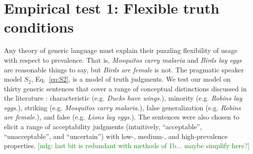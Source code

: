 \documentclass[12pt,letterpaper]{article}
\newcommand{\denote}[1]{\mbox{ $[\![ #1 ]\!]$}}
\newcommand{\ndg}[1]{\textcolor{Green}{[ndg: #1]}}
\begin{document}
%
%
%
%
%




%

\section*{Empirical test 1: Flexible truth conditions}

Any theory of generic language must explain their puzzling flexibility of usage with respect to prevalence.
That is, \emph{Mosquitos carry malaria} and \emph{Birds lay eggs} are reasonable things to say, but \emph{Birds are female} is not.
The pragmatic speaker model $S_2$, Eq.~\ref{eq:S2}, is a model of truth judgments. 
We test our model on thirty generic sentences 
that cover a range of conceptual distinctions discussed in the literature  \cite{Prasada2013}: characteristic (e.g. \emph{Ducks have wings.}), minority (e.g. \emph{Robins lay eggs.}), striking (e.g. \emph{Mosquitos carry malaria.}), false generalization (e.g. \emph{Robins are female.}), and false (e.g. \emph{Lions lay eggs.}).
The sentences were also chosen to elicit a range of acceptability judgments (intuitively, ``acceptable'', ``unacceptable'', and ``uncertain'') with low-, medium-, and high-prevalence properties. \ndg{last bit is redundant with methods of 1b... maybe simplify here?}
\end{document}

